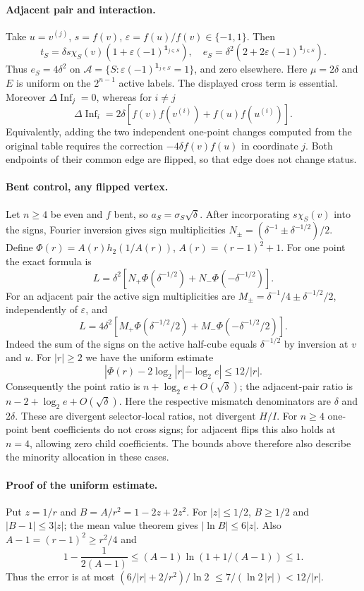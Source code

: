 \documentclass{article}
\begin{document}
\paragraph{Adjacent pair and interaction.}
Take $u=v^{(j)}$, $s=f(v)$, $\varepsilon=f(u)/f(v)\in\{-1,1\}$.
Then
\[
t_S=\delta s\chi_S(v)(1+\varepsilon(-1)^{\mathbf1_{j\in S}}),
\quad e_S=\delta^2(2+2\varepsilon(-1)^{\mathbf1_{j\in S}}).
\]
Thus $e_S=4\delta^2$ on
$\mathcal A=\{S: \varepsilon(-1)^{\mathbf1_{j\in S}}=1\}$,
and zero elsewhere. Here $\mu=2\delta$ and $E$ is uniform on
the $2^{n-1}$ active labels. The displayed cross term is essential.
Moreover $\Delta\operatorname{Inf}_j=0$, whereas for $i\ne j$
\[
\Delta\operatorname{Inf}_i
=2\delta[f(v)f(v^{(i)})+f(u)f(u^{(i)})].
\]
Equivalently, adding the two independent one-point changes computed
from the original table requires the correction
$-4\delta f(v)f(u)$ in coordinate $j$. Both endpoints of their
common edge are flipped, so that edge does not change status.

\paragraph{Bent control, any flipped vertex.}
Let $n\ge4$ be even and $f$ bent, so $a_S=\sigma_S\sqrt\delta$.
After incorporating $s\chi_S(v)$ into the signs, Fourier inversion gives
sign multiplicities $N_\pm=(\delta^{-1}\pm\delta^{-1/2})/2$.
Define $\Phi(r)=A(r)h_2(1/A(r))$, $A(r)=(r-1)^2+1$.
For one point the exact formula is
\[
L=\delta^2[N_+\Phi(\delta^{-1/2})+N_-\Phi(-\delta^{-1/2})].
\]
For an adjacent pair the active sign multiplicities are
$M_\pm=\delta^{-1}/4\pm\delta^{-1/2}/2$, independently of
$\varepsilon$, and
\[
L=4\delta^2[M_+\Phi(\delta^{-1/2}/2)+M_-\Phi(-\delta^{-1/2}/2)].
\]
Indeed the sum of the signs on the active half-cube equals
$\delta^{-1/2}$ by inversion at $v$ and $u$.
For $|r|\ge2$ we have the uniform estimate
\[
|\Phi(r)-2\log_2|r|-\log_2 e|\le 12/|r|. \tag{*}
\]
Consequently the point ratio is $n+\log_2e+O(\sqrt\delta)$;
the adjacent-pair ratio is $n-2+\log_2e+O(\sqrt\delta)$.
Here the respective mismatch denominators are $\delta$ and $2\delta$.
These are divergent selector-local ratios, not divergent $H/I$.
For $n\ge4$ one-point bent coefficients do not cross signs;
for adjacent flips this also holds at $n=4$, allowing zero child coefficients.
The bounds above therefore also describe the minority allocation in these cases.

\paragraph{Proof of the uniform estimate.}
Put $z=1/r$ and $B=A/r^2=1-2z+2z^2$.
For $|z|\le1/2$, $B\ge1/2$ and $|B-1|\le3|z|$;
the mean value theorem gives $|\ln B|\le6|z|$.
Also $A-1=(r-1)^2\ge r^2/4$ and
\[
1-\frac1{2(A-1)}\le (A-1)\ln(1+1/(A-1))\le1.
\]
Thus the error is at most $(6/|r|+2/r^2)/\ln2$
$\le 7/(\ln2\,|r|)<12/|r|$.
\end{document}
